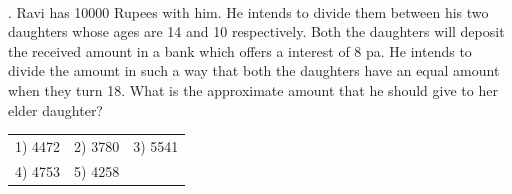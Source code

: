 \documentclass{article}
\begin{document}
	\noindent 
	
	\noindent 
	
	\noindent  \\ 
	
	. Ravi has 10000 Rupees with him. He intends to divide them between his two daughters whose ages are 14 and 10 respectively. Both the daughters will deposit the received amount in a bank which offers a interest of 8 pa. He intends to divide the amount in such a way that both the daughters have an equal amount when they turn 18. What is the approximate amount that he should give to her elder daughter?
	
	\noindent \begin{tabular}{p{1.7in} p{1.6in} p{1.6in}} \\ 
 1) 4472                    & 2) 3780             & 3) 5541              \\
4) 4753             & 5) 4258 \\
\end{tabular}
	
	\noindent 
\end{document}
